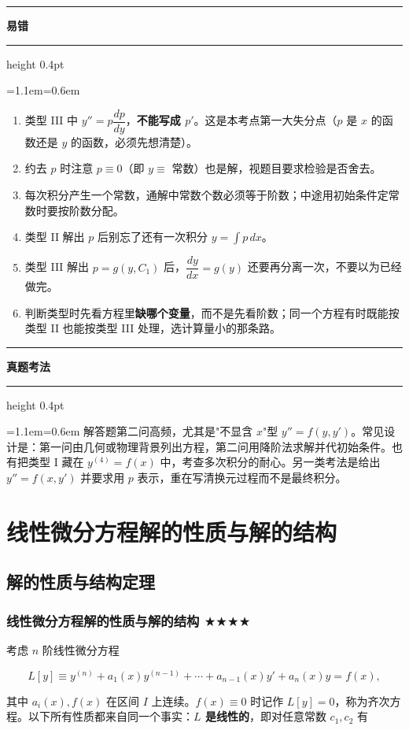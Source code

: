 \documentclass[11pt,openany,UTF8]{ctexbook}
\newcommand{\callouthead}[2]{%
  \par\addvspace{7pt}\noindent
  {\color{#1}\rule[-0.15em]{3pt}{1.05em}}\hspace{0.5em}%
  {\bfseries\color{#1}#2}\par\nobreak\vspace{-0.35em}%
  {\color{rulesep}\hrule height 0.4pt}\nobreak\vspace{0.45em}%
  \begingroup\small\setlength{\parindent}{0pt}%
  \leftskip=1.1em\rightskip=0.6em\noindent\ignorespaces}
\newcommand{\calloutend}{\par\endgroup\addvspace{7pt}}
\newenvironment{callwarn}[1]{\callouthead{warnbar}{#1}}{\calloutend}
\newenvironment{callexam}[1]{\callouthead{exambar}{#1}}{\calloutend}
\begin{document}
\begin{callwarn}{易错}
\begin{enumerate}
\item 类型 III 中 $y''=p\dfrac{dp}{dy}$，\textbf{不能写成 $p'$}。这是本考点第一大失分点（$p$ 是 $x$ 的函数还是 $y$ 的函数，必须先想清楚）。
\item 约去 $p$ 时注意 $p\equiv 0$（即 $y\equiv$ 常数）也是解，视题目要求检验是否舍去。
\item 每次积分产生一个常数，通解中常数个数必须等于阶数；中途用初始条件定常数时要按阶数分配。
\item 类型 II 解出 $p$ 后别忘了还有一次积分 $y=\int p\,dx$。
\item 类型 III 解出 $p=g(y,C_1)$ 后，$\dfrac{dy}{dx}=g(y)$ 还要再分离一次，不要以为已经做完。
\item 判断类型时先看方程里\textbf{缺哪个变量}，而不是先看阶数；同一个方程有时既能按类型 II 也能按类型 III 处理，选计算量小的那条路。
\end{enumerate}
\end{callwarn}

\begin{callexam}{真题考法}
解答题第二问高频，尤其是"不显含 $x$"型 $y''=f(y,y')$。常见设计是：第一问由几何或物理背景列出方程，第二问用降阶法求解并代初始条件。也有把类型 I 藏在 $y^{(4)}=f(x)$ 中，考查多次积分的耐心。另一类考法是给出 $y''=f(x,y')$ 并要求用 $p$ 表示，重在写清换元过程而不是最终积分。

\end{callexam}

\section{线性微分方程解的性质与解的结构}

\subsection{解的性质与结构定理}

\subsubsection{线性微分方程解的性质与解的结构 $\bigstar$$\bigstar$$\bigstar$$\bigstar$}

考虑 $n$ 阶线性微分方程

\[L[y]\equiv y^{(n)}+a_1(x)y^{(n-1)}+\cdots+a_{n-1}(x)y'+a_n(x)y=f(x),\]

其中 $a_i(x),f(x)$ 在区间 $I$ 上连续。$f(x)\equiv 0$ 时记作 $L[y]=0$，称为齐次方程。以下所有性质都来自同一个事实：\textbf{$L$ 是线性的}，即对任意常数 $c_1,c_2$ 有
\end{document}
